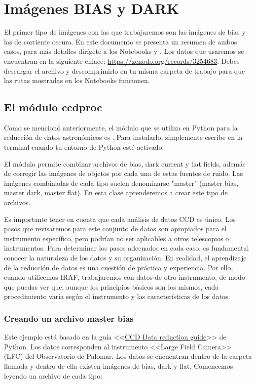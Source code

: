 \chapter{Imágenes BIAS y DARK}
\setcounter{ipythcntr}{0}

El primer tipo de imágenes con las que trabajaremos son las imágenes de bias y las de corriente oscura. En este documento se presenta un resumen de ambos casos, para más detalles dirígete a los Notebooks  y . Los datos que usaremos se encuentran en la siguiente enlace: \url{https://zenodo.org/records/3254683}. Debes descargar el archivo y descomprimirlo en tu misma carpeta de trabajo para que las rutas mostradas en los Notebooks funcionen. 

\section{El módulo ccdproc}
Como se mencionó anteriormente, el módulo que se utiliza en Python para la reducción de datos astronómicos es . Para instalarlo, simplemente escribe  en la terminal cuando tu entorno de Python esté activado.

El módulo  permite combinar archivos de bias, dark current y flat fields, además de corregir las imágenes de objetos por cada una de estas fuentes de ruido. Las imágenes combinadas de cada tipo suelen denominarse "master" (master bias, master dark, master flat). En esta clase aprenderemos a crear este tipo de archivos.

Es importante tener en cuenta que cada análisis de datos CCD es único. Los pasos que revisaremos para este conjunto de datos son apropiados para el instrumento específico, pero podrían no ser aplicables a otros telescopios o instrumentos. Para determinar los pasos adecuados en cada caso, es fundamental conocer la naturaleza de los datos y su organización. En realidad, el aprendizaje de la reducción de datos es una cuestión de práctica y experiencia. Por ello, cuando utilicemos IRAF, trabajaremos con datos de otro instrumento, de modo que puedas ver que, aunque los principios básicos son los mismos, cada procedimiento varía según el instrumento y las características de los datos.

\subsection{Creando un archivo master bias}
Este ejemplo está basado en la guía <<\href{}{CCD Data reduction guide}>> de Python. Los datos corresponden al instrumento <<Large Field Camera>> (LFC) del Observatorio de Palomar. Los datos se encuentran dentro de la carpeta llamada  y dentro de ella existen imágenes de bias, dark y flat. Comencemos leyendo un archivo de cada tipo:

